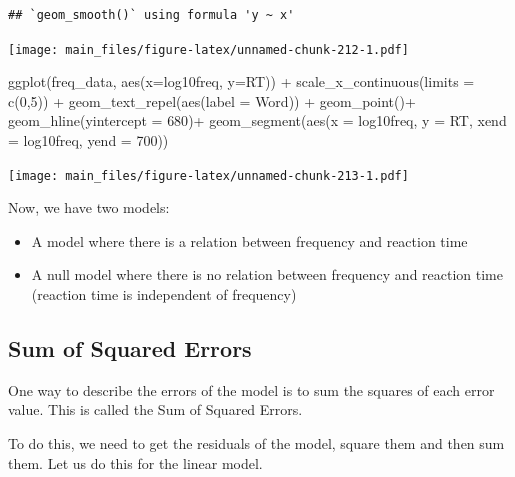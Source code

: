 \documentclass[
]{book}
\newenvironment{Shaded}{\begin{snugshade}}{\end{snugshade}}
\newcommand{\AttributeTok}[1]{\textcolor[rgb]{0.77,0.63,0.00}{#1}}
\newcommand{\DecValTok}[1]{\textcolor[rgb]{0.00,0.00,0.81}{#1}}
\newcommand{\FunctionTok}[1]{\textcolor[rgb]{0.00,0.00,0.00}{#1}}
\newcommand{\NormalTok}[1]{#1}
\newcommand{\SpecialCharTok}[1]{\textcolor[rgb]{0.00,0.00,0.00}{#1}}
\providecommand{\tightlist}{%
  \setlength{\itemsep}{0pt}\setlength{\parskip}{0pt}}
\begin{document}
\begin{verbatim}
## `geom_smooth()` using formula 'y ~ x'
\end{verbatim}

\texttt{[image: main\_files/figure-latex/unnamed-chunk-212-1.pdf]}

\begin{Shaded}
\begin{Highlighting}[]
\FunctionTok{ggplot}\NormalTok{(freq\_data, }\FunctionTok{aes}\NormalTok{(}\AttributeTok{x=}\NormalTok{log10freq, }\AttributeTok{y=}\NormalTok{RT)) }\SpecialCharTok{+}
  \FunctionTok{scale\_x\_continuous}\NormalTok{(}\AttributeTok{limits =} \FunctionTok{c}\NormalTok{(}\DecValTok{0}\NormalTok{,}\DecValTok{5}\NormalTok{)) }\SpecialCharTok{+}
  \FunctionTok{geom\_text\_repel}\NormalTok{(}\FunctionTok{aes}\NormalTok{(}\AttributeTok{label =}\NormalTok{ Word)) }\SpecialCharTok{+}
  \FunctionTok{geom\_point}\NormalTok{()}\SpecialCharTok{+}
  \FunctionTok{geom\_hline}\NormalTok{(}\AttributeTok{yintercept =} \DecValTok{680}\NormalTok{)}\SpecialCharTok{+}
  \FunctionTok{geom\_segment}\NormalTok{(}\FunctionTok{aes}\NormalTok{(}\AttributeTok{x =}\NormalTok{ log10freq, }\AttributeTok{y =}\NormalTok{ RT,}
                   \AttributeTok{xend =}\NormalTok{ log10freq, }\AttributeTok{yend =} \DecValTok{700}\NormalTok{))}
\end{Highlighting}
\end{Shaded}

\texttt{[image: main\_files/figure-latex/unnamed-chunk-213-1.pdf]}

Now, we have two models:

\begin{itemize}
\tightlist
\item
  A model where there is a relation between frequency and reaction time
\item
  A null model where there is no relation between frequency and reaction time (reaction time is independent of frequency)
\end{itemize}

\hypertarget{sum-of-squared-errors}{%
\subsection{Sum of Squared Errors}\label{sum-of-squared-errors}}

One way to describe the errors of the model is to sum the squares of each error value. This is called the Sum of Squared Errors.

To do this, we need to get the residuals of the model, square them and then sum them. Let us do this for the linear model.
\end{document}
